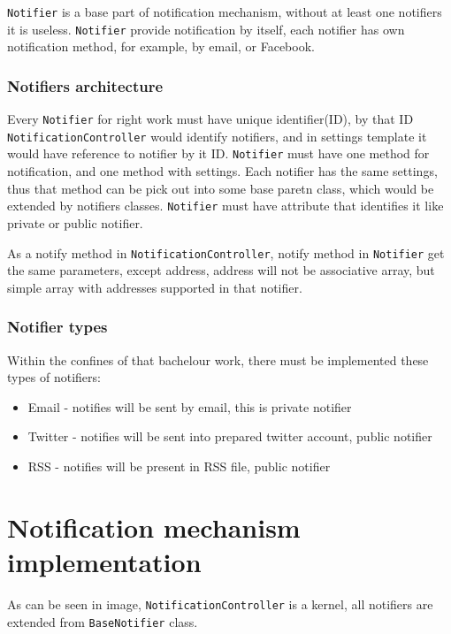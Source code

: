 \texttt{Notifier} is a base part of notification mechanism, without at least one notifiers it is useless. \texttt{Notifier} provide notification by itself, each notifier has own notification method, for example, by email, or Facebook.

\subsection{Notifiers architecture}

Every \texttt{Notifier} for right work must have unique identifier(ID), by that ID \texttt{NotificationController} would identify notifiers, and in settings template it would have reference to notifier by it ID. \texttt{Notifier} must have one method for notification, and one method with settings. Each notifier has the same settings, thus that method can be pick out into some base paretn class, which would be extended by notifiers classes. \texttt{Notifier} must have attribute that identifies it like private or public notifier.

As a notify method in \texttt{NotificationController}, notify method in \texttt{Notifier} get the same parameters, except address, address will not be associative array, but simple array with addresses supported in that notifier. 

\subsection{Notifier types}

Within the confines of that bachelour work, there must be implemented these types of notifiers:
\begin{itemize} 
\item Email - notifies will be sent by email, this is private notifier
\item Twitter - notifies will be sent into prepared twitter account, public notifier
\item RSS - notifies will be present in RSS file, public notifier
\end{itemize}  

\chapter{Notification mechanism implementation}

As can be seen in image, \texttt{NotificationController} is a kernel, all notifiers are extended from \texttt{BaseNotifier} class.

